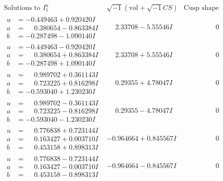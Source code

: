 \documentclass[1p]{elsarticle_modified}
\theoremstyle{definition}
\newcommand{\I}{\sqrt{-1}}
\begin{document}
$$\begin{array}{c|c|c}  
\text{Solutions to }I^u_{1}& \I (\text{vol} + \sqrt{-1}CS) & \text{Cusp shape}\\
 \hline 
\begin{aligned}
u &= -0.449463 + 0.920420 I \\
a &= \phantom{-}0.380654 - 0.863384 I \\
b &= -0.287498 - 1.090140 I\end{aligned}
 & \phantom{-}2.33708 - 5.55546 I & \phantom{-0.000000 } 0 \\ \hline\begin{aligned}
u &= -0.449463 - 0.920420 I \\
a &= \phantom{-}0.380654 + 0.863384 I \\
b &= -0.287498 + 1.090140 I\end{aligned}
 & \phantom{-}2.33708 + 5.55546 I & \phantom{-0.000000 } 0 \\ \hline\begin{aligned}
u &= \phantom{-}0.989702 + 0.361143 I \\
a &= \phantom{-}0.723225 + 0.816298 I \\
b &= -0.593040 + 1.230230 I\end{aligned}
 & \phantom{-}0.29355 + 4.78047 I & \phantom{-0.000000 } 0 \\ \hline\begin{aligned}
u &= \phantom{-}0.989702 - 0.361143 I \\
a &= \phantom{-}0.723225 - 0.816298 I \\
b &= -0.593040 - 1.230230 I\end{aligned}
 & \phantom{-}0.29355 - 4.78047 I & \phantom{-0.000000 } 0 \\ \hline\begin{aligned}
u &= \phantom{-}0.776838 + 0.723144 I \\
a &= \phantom{-}0.163427 + 0.003710 I \\
b &= \phantom{-}0.453158 + 0.898313 I\end{aligned}
 & -0.964664 + 0.845567 I & \phantom{-0.000000 } 0 \\ \hline\begin{aligned}
u &= \phantom{-}0.776838 - 0.723144 I \\
a &= \phantom{-}0.163427 - 0.003710 I \\
b &= \phantom{-}0.453158 - 0.898313 I\end{aligned}
 & -0.964664 - 0.845567 I & \phantom{-0.000000 } 0 \\ \hline\begin{aligned}

\end{aligned}
\end{array}$$
\end{document}
